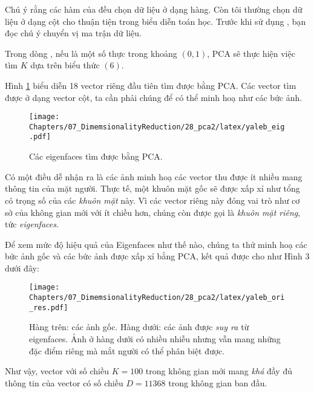 Chú ý rằng các hàm của  đều chọn dữ liệu ở dạng hàng. Còn tôi thường chọn dữ liệu ở dạng cột cho thuận tiện trong biểu diễn toán học. Trước khi sử dụng , bạn đọc chú ý chuyển vị ma trận dữ liệu. 
 
Trong dòng , nếu  là một số thực trong khoảng $(0, 1)$, PCA sẽ thực hiện việc tìm $K$ dựa trên biểu thức $(6)$. 
 
Hình \ref{fig:28_2} biểu diễn 18 vector riêng đầu tiên tìm được bằng PCA. Các vector tìm được ở dạng vector cột, ta cần phải  chúng để có thể minh hoạ như các bức ảnh. 
 
 

\begin{figure}[t]
\centering
    \texttt{[image: Chapters/07\_DimemsionalityReduction/28\_pca2/latex/yaleb\_eig.pdf]}
    \caption[]{Các eigenfaces tìm được bằng PCA.}
    \label{fig:28_2}
\end{figure}
 
Có một điều dễ nhận ra là các ảnh minh hoạ các vector thu được ít nhiều mang thông tin của mặt người. Thực tế, một khuôn mặt gốc sẽ được xấp xỉ như tổng có trọng số của các \textit{khuôn mặt} này. Vì các vector riêng này đóng vai trò như cơ sở của không gian mới với ít chiều hơn, chúng còn được gọi là \textit{khuôn mặt riêng}, tức \textit{eigenfaces}. 
 
Để xem mức độ hiệu quả của Eigenfaces như thế nào, chúng ta thử minh hoạ các bức ảnh gốc và các bức ảnh được xấp xỉ bằng PCA, kết quả được cho như Hình 3 dưới đây: 
 

\begin{figure}[t]
\centering
    \texttt{[image: Chapters/07\_DimemsionalityReduction/28\_pca2/latex/yaleb\_ori\_res.pdf]}
    \caption[]{Hàng trên: các ảnh gốc. Hàng dưới: các ảnh được \textit{suy ra} từ eigenfaces. Ảnh ở hàng dưới có nhiều nhiễu nhưng vẫn mang những đặc điểm riêng mà mắt người có thể phân biệt được.}
    \label{fig:28_3}
\end{figure}
Như vậy, vector với số chiều $K = 100$ trong không gian mới mang \textit{khá} đầy đủ thông tin của vector có số chiều $D = 11368$ trong không gian ban đầu. 
 
